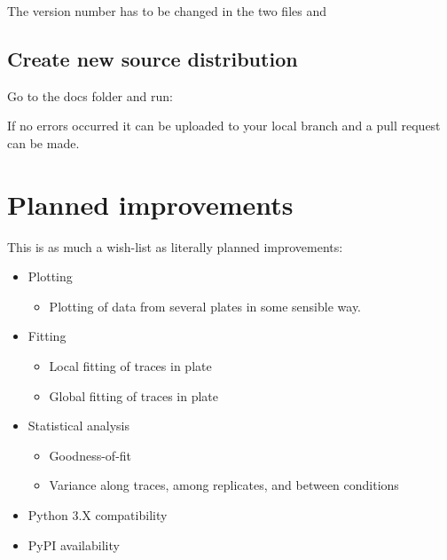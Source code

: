 \documentclass[letterpaper,10pt,english]{sphinxmanual}
\begin{document}
The version number has to be changed in the two files  and


\subsection{Create new source distribution}
\label{\detokenize{contribute:semantic-versioning}}\label{\detokenize{contribute:create-new-source-distribution}}
Go to the docs folder and run:

%
\begin{sphinxVerbatim}[commandchars=\\\{\}]
\end{sphinxVerbatim}

If no errors occurred it can be uploaded to your local branch and
a pull request can be made.


\section{Planned improvements}
\label{\detokenize{contribute:planned-improvements}}
This is as much a wish-list as literally planned improvements:
\begin{itemize}
\item {} 
Plotting
\begin{itemize}
\item {} 
Plotting of data from several plates in some sensible way.

\end{itemize}

\item {} 
Fitting
\begin{itemize}
\item {} 
Local fitting of traces in plate

\item {} 
Global fitting of traces in plate

\end{itemize}

\item {} 
Statistical analysis
\begin{itemize}
\item {} 
Goodness-of-fit

\item {} 
Variance along traces, among replicates, and between conditions

\end{itemize}

\item {} 
Python 3.X compatibility

\item {} 
PyPI availability

\end{itemize}
\end{document}

